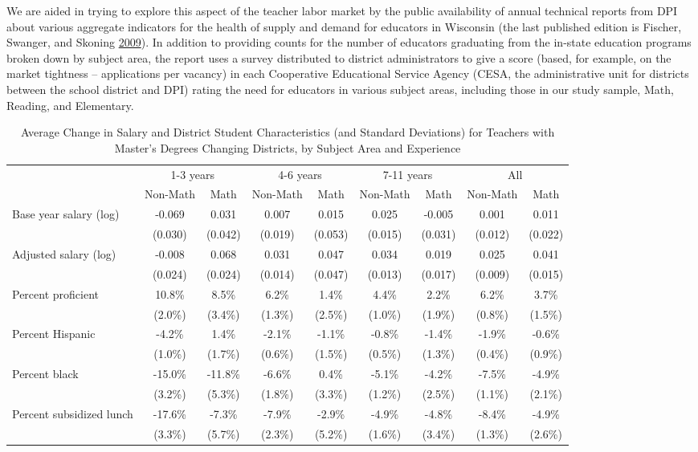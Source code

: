 \documentclass[12pt,]{article}
\begin{document}
We are aided in trying to explore this aspect of the teacher labor
market by the public availability of annual technical reports from DPI
about various aggregate indicators for the health of supply and demand
for educators in Wisconsin (the last published edition is Fischer,
Swanger, and Skoning \protect\hyperlink{ref-fischer}{2009}). In addition
to providing counts for the number of educators graduating from the
in-state education programs broken down by subject area, the report uses
a survey distributed to district administrators to give a score (based,
for example, on the market tightness -- applications per vacancy) in
each Cooperative Educational Service Agency (CESA, the administrative
unit for districts between the school district and DPI) rating the need
for educators in various subject areas, including those in our study
sample, Math, Reading, and Elementary.

\begin{sidewaystable}[htbp]
\centering
\begin{tabular}{lcccccccc}
  \hline
 & \multicolumn{2}{c}{1-3 years} & \multicolumn{2}{c}{4-6 years} & \multicolumn{2}{c}{7-11 years} & \multicolumn{2}{c}{All}\\ \cline{2-3} \cline{4-5} \cline{6-7} \cline{8-9}
 & Non-Math & Math & Non-Math & Math & Non-Math & Math & Non-Math & Math \\ 
  \hline
Base year salary (log) & -0.069 & 0.031 & 0.007 & 0.015 & 0.025 & -0.005 & 0.001 & 0.011 \\ 
   & (0.030) & (0.042) & (0.019) & (0.053) & (0.015) & (0.031) & (0.012) & (0.022) \\ 
  Adjusted salary (log) & -0.008 & 0.068 & 0.031 & 0.047 & 0.034 & 0.019 & 0.025 & 0.041 \\ 
   & (0.024) & (0.024) & (0.014) & (0.047) & (0.013) & (0.017) & (0.009) & (0.015) \\ 
  Percent proficient & 10.8\% & 8.5\% & 6.2\% & 1.4\% & 4.4\% & 2.2\% & 6.2\% & 3.7\% \\ 
   & (2.0\%) & (3.4\%) & (1.3\%) & (2.5\%) & (1.0\%) & (1.9\%) & (0.8\%) & (1.5\%) \\ 
  Percent Hispanic & -4.2\% & 1.4\% & -2.1\% & -1.1\% & -0.8\% & -1.4\% & -1.9\% & -0.6\% \\ 
   & (1.0\%) & (1.7\%) & (0.6\%) & (1.5\%) & (0.5\%) & (1.3\%) & (0.4\%) & (0.9\%) \\ 
  Percent black & -15.0\% & -11.8\% & -6.6\% & 0.4\% & -5.1\% & -4.2\% & -7.5\% & -4.9\% \\ 
   & (3.2\%) & (5.3\%) & (1.8\%) & (3.3\%) & (1.2\%) & (2.5\%) & (1.1\%) & (2.1\%) \\ 
  Percent subsidized lunch & -17.6\% & -7.3\% & -7.9\% & -2.9\% & -4.9\% & -4.8\% & -8.4\% & -4.9\% \\ 
   & (3.3\%) & (5.7\%) & (2.3\%) & (5.2\%) & (1.6\%) & (3.4\%) & (1.3\%) & (2.6\%) \\ 
   \hline
\end{tabular}
\caption{Average Change in Salary and District Student Characteristics (and Standard Deviations) for Teachers with Master's Degrees Changing Districts, by Subject Area and Experience} 
\label{tbl:change_area_by_ge}
\end{sidewaystable}
\end{document}
